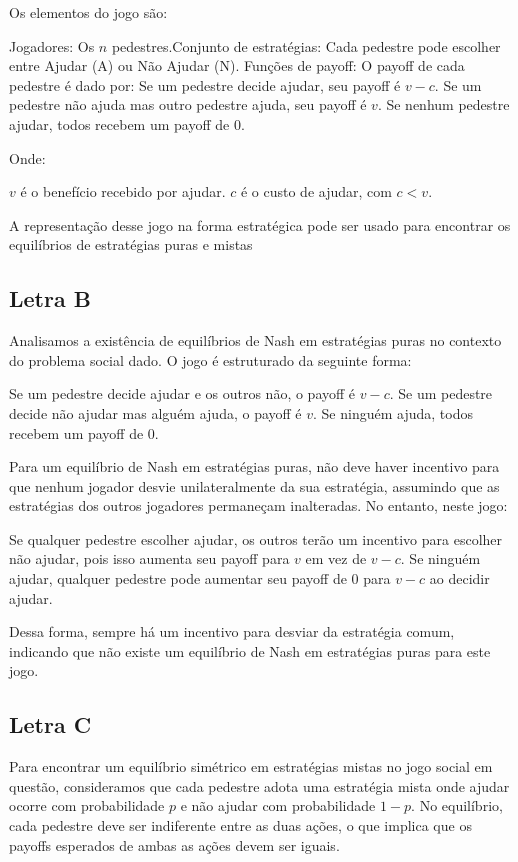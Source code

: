 \documentclass[12pt]{article}
\begin{document}
Os elementos do jogo são:

Jogadores: Os \( n \) pedestres.Conjunto de estratégias: Cada pedestre pode escolher entre Ajudar 
 (A) ou Não Ajudar (N). Funções de payoff: O payoff de cada pedestre é dado por:
    Se um pedestre decide ajudar, seu payoff é \( v - c \).
    Se um pedestre não ajuda mas outro pedestre ajuda, seu payoff é \( v \).
    Se nenhum pedestre ajudar, todos recebem um payoff de 0.


Onde:

\( v \) é o benefício recebido por ajudar.
 \( c \) é o custo de ajudar, com \( c < v \).

A representação desse jogo na forma estratégica pode ser usado para encontrar os equilíbrios de estratégias puras e mistas


\subsection{\textbf{Letra B}}
Analisamos a existência de equilíbrios de Nash em estratégias puras no contexto do problema social dado. O jogo é estruturado da seguinte forma:

Se um pedestre decide ajudar e os outros não, o payoff é \( v - c \).
Se um pedestre decide não ajudar mas alguém ajuda, o payoff é \( v \).
Se ninguém ajuda, todos recebem um payoff de 0.

Para um equilíbrio de Nash em estratégias puras, não deve haver incentivo para que nenhum jogador desvie unilateralmente da sua estratégia, assumindo que as estratégias dos outros jogadores permaneçam inalteradas. No entanto, neste jogo:

Se qualquer pedestre escolher ajudar, os outros terão um incentivo para escolher não ajudar, pois isso aumenta seu payoff para \( v \) em vez de \( v - c \).
Se ninguém ajudar, qualquer pedestre pode aumentar seu payoff de 0 para \( v - c \) ao decidir ajudar.

Dessa forma, sempre há um incentivo para desviar da estratégia comum, indicando que não existe um equilíbrio de Nash em estratégias puras para este jogo.

\subsection{\textbf{Letra C}}
Para encontrar um equilíbrio simétrico em estratégias mistas no jogo social em questão, consideramos que cada pedestre adota uma estratégia mista onde ajudar ocorre com probabilidade \( p \) e não ajudar com probabilidade \( 1 - p \). No equilíbrio, cada pedestre deve ser indiferente entre as duas ações, o que implica que os payoffs esperados de ambas as ações devem ser iguais.
\end{document}

